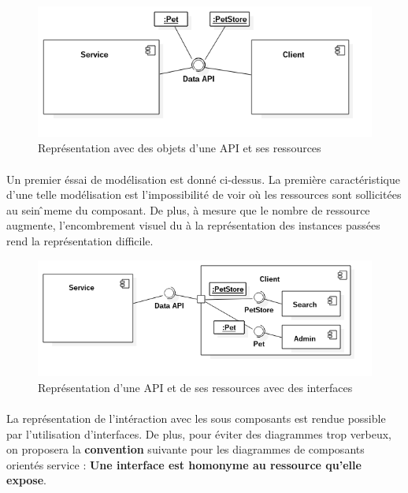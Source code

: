         \begin{figure}[h]
            \centering
            \includegraphics[scale=0.6]{./assets/UML/component1.png}
            \caption{Représentation avec des objets d'une API et ses ressources}
        \end{figure}

        \paragraph{}
            Un premier éssai de modélisation est donné ci-dessus. La première caractéristique d'une telle
            modélisation est l'impossibilité de voir où les ressources sont sollicitées au sein ̂meme
            du composant. De plus, à mesure que le nombre de ressource augmente,  l'encombrement visuel
            du à la représentation des instances passées rend la représentation difficile.

        \begin{figure}[h]
            \centering
            \includegraphics[scale=0.6]{./assets/UML/component3.png}
            \caption{Représentation d'une API et de ses ressources avec des interfaces}
        \end{figure}

        \paragraph{}
            La représentation de l'intéraction avec les sous composants est rendue possible par l'utilisation
            d'interfaces. De plus, pour éviter des diagrammes trop verbeux, on proposera la \textbf{convention}
            suivante pour les diagrammes de composants orientés service : \textbf{Une interface
            est homonyme au ressource qu'elle expose}.

